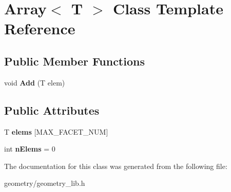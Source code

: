 \hypertarget{class_array}{}\section{Array$<$ T $>$ Class Template Reference}
\label{class_array}
\subsection*{Public Member Functions}
\begin{DoxyCompactItemize}
\item 
\mbox{\label{class_array_ababd1630185238fc7ae53eb5511c387c}} 
void {\bfseries Add} (T elem)
\end{DoxyCompactItemize}
\subsection*{Public Attributes}
\begin{DoxyCompactItemize}
\item 
\mbox{\label{class_array_a1320e9390ef809dc599b9d9f15889243}} 
T {\bfseries elems} \mbox{[}M\+A\+X\+\_\+\+F\+A\+C\+E\+T\+\_\+\+N\+UM\mbox{]}
\item 
\mbox{\label{class_array_a126a35ed55d30c6ab4955c99d8b2d4ed}} 
int {\bfseries n\+Elems} = 0
\end{DoxyCompactItemize}


The documentation for this class was generated from the following file\+:\begin{DoxyCompactItemize}
\item 
geometry/geometry\+\_\+lib.\+h\end{DoxyCompactItemize}
